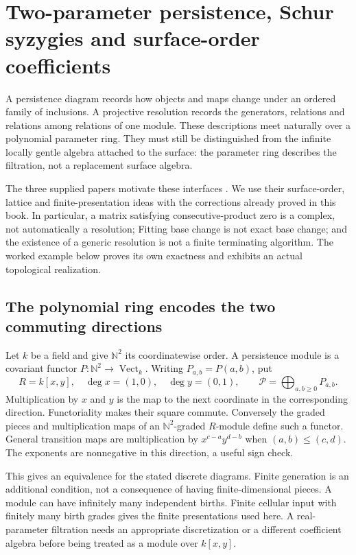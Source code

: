 \chapter[Persistence and explicit resolutions]{Two-parameter persistence, Schur syzygies and surface-order coefficients}
\label{pers:chapter}
A persistence diagram records how objects and maps change under an ordered
family of inclusions. A projective resolution records the generators,
relations and relations among relations of one module. These descriptions
meet naturally over a polynomial parameter ring. They must still be
distinguished from the infinite locally gentle algebra attached to the
surface: the parameter ring describes the filtration, not a replacement
surface algebra.

The three supplied papers motivate these interfaces
\cite{PersSurfaceI,PersSurfaceII,PersSurvey}. We use their surface-order,
lattice and finite-presentation ideas with the corrections already proved
in this book. In particular, a matrix satisfying consecutive-product zero
is a complex, not automatically a resolution; Fitting base change is not
exact base change; and the existence of a generic resolution is not a
finite terminating algorithm. The worked example below proves its own
exactness and exhibits an actual topological realization.

\section{The polynomial ring encodes the two commuting directions}
Let $k$ be a field and give $\mathbb N^2$ its coordinatewise order. A
persistence module is a covariant functor $P:\mathbb N^2\to\operatorname{Vect}_k$.
Writing $P_{a,b}=P(a,b)$, put
\[
 R=k[x,y],\quad \deg x=(1,0),\quad\deg y=(0,1),\qquad
 \mathcal P=\bigoplus_{a,b\ge0}P_{a,b}.
\]
Multiplication by $x$ and $y$ is the map to the next coordinate in the
corresponding direction. Functoriality makes their square commute.
Conversely the graded pieces and multiplication maps of an
$\mathbb N^2$-graded $R$-module define such a functor. General transition
maps are multiplication by $x^{c-a}y^{d-b}$ when $(a,b)\le(c,d)$.
The exponents are nonnegative in this direction, a useful sign check.

This gives an equivalence for the stated discrete diagrams. Finite
generation is an additional condition, not a consequence of having
finite-dimensional pieces. A module can have infinitely many independent
births. Finite cellular input with finitely many birth grades gives the
finite presentations used here. A real-parameter filtration needs an
appropriate discretization or a different coefficient algebra before
being treated as a module over $k[x,y]$.

